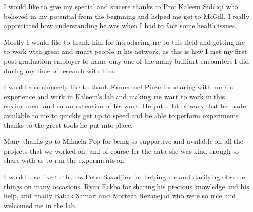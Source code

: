 I would like to give my special and sincere thanks to Prof Kaleem Siddiqi who believed in my potential from the beginning and helped me get to McGill. I really appreciated how understanding he was when I had to face some health issues.

Mostly I would like to thank him for introducing me to this field and getting me to work with great and smart people in his network, as this is how I met my first post-graduation employer to name only one of the many brilliant encounters I did during my time of research with him.

I would also sincerely like to thank Emmanuel Piuze for sharing with me his experience and work in Kaleem's lab and making me want to work in this environment and on an extension of his work. He put a lot of work that he made available to me to quickly get up to speed and be able to perform experiments thanks to the great tools he put into place.

Many thanks go to Mihaela Pop for being so supportive and available on all the projects that we worked on, and of course for the data she was kind enough to share with us to run the experiments on.

I would also like to thanks Peter Savadjiev for helping me and clarifying obscure things on many occasions, Ryan Eckbo for sharing his precious knowledge and his help, and finally Babak Samari and Morteza Rezanejad who were so nice and welcomed me in the lab.